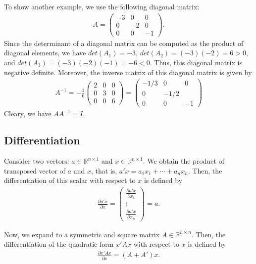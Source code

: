 \documentclass[
  12pt,
]{article}
\begin{document}
To show another example, we use the following diagonal matrix:
\begin{align*}
  A = 
  \begin{pmatrix}
    -3 & 0 & 0 \\
    0 & -2 & 0 \\
    0 & 0 & -1
  \end{pmatrix}.
\end{align*} Since the determinant of a diagonal matrix can be computed
as the product of diagonal elements, we have \(det(A_1) = -3\),
\(det(A_2) = (-3)(-2) = 6 > 0\), and
\(det(A_3) = (-3)(-2)(-1) = -6 < 0\). Thus, this diagonal matrix is
negative definite. Moreover, the inverse matrix of this diagonal matrix
is given by \begin{align*}
  A^{-1} = -\frac{1}{6}
  \begin{pmatrix}
    2 & 0 & 0 \\
    0 & 3 & 0 \\
    0 & 0 & 6
  \end{pmatrix}
  = 
  \begin{pmatrix}
    -1/3 & 0 & 0 \\
    0 & -1/2 & \\
    0 & 0 & -1
  \end{pmatrix}
\end{align*} Cleary, we have \(A A^{-1} = I\).

\hypertarget{differentiation}{%
\subsection{Differentiation}\label{differentiation}}

Consider two vectors: \(a \in \mathbb{R}^{n \times 1}\) and
\(x \in \mathbb{R}^{n \times 1}\). We obtain the product of transposed
vector of \(a\) and \(x\), that is,
\(a'x = a_1 x_1 + \cdots + a_n x_n\). Then, the differentiation of this
scalar with respect to \(x\) is defined by \begin{align*}
  \frac{\partial a'x}{\partial x}
  = 
  \begin{pmatrix} \frac{\partial a'x}{\partial x_1} \\ \vdots \\ \frac{\partial a'x}{\partial x_n} \end{pmatrix}
  = 
  a.
\end{align*}

Now, we expand to a symmetric and square matrix
\(A \in \mathbb{R}^{n \times n}\). Then, the differentiation of the
quadratic form \(x' A x\) with respect to \(x\) is defined by
\begin{align*}
  \frac{\partial x'Ax}{\partial x} = (A + A')x.
\end{align*}
\end{document}
